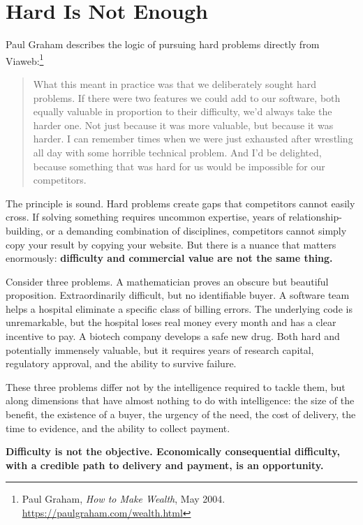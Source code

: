 \section{Hard Is Not Enough}
\label{sec:ch01-hard-is-not-enough}

Paul Graham describes the logic of pursuing hard problems directly from Viaweb:\footnote{Paul Graham, \emph{How to Make Wealth}, May 2004. \url{https://paulgraham.com/wealth.html}}

\begin{quote}
What this meant in practice was that we deliberately sought hard problems. If there were two features we could add to our software, both equally valuable in proportion to their difficulty, we'd always take the harder one. Not just because it was more valuable, but because it was harder. I can remember times when we were just exhausted after wrestling all day with some horrible technical problem. And I'd be delighted, because something that was hard for us would be impossible for our competitors.
\end{quote}

The principle is sound. Hard problems create gaps that competitors cannot easily cross. If solving something requires uncommon expertise, years of relationship-building, or a demanding combination of disciplines, competitors cannot simply copy your result by copying your website. But there is a nuance that matters enormously: \textbf{difficulty and commercial value are not the same thing.}

Consider three problems. A mathematician proves an obscure but beautiful proposition. Extraordinarily difficult, but no identifiable buyer. A software team helps a hospital eliminate a specific class of billing errors. The underlying code is unremarkable, but the hospital loses real money every month and has a clear incentive to pay. A biotech company develops a safe new drug. Both hard and potentially immensely valuable, but it requires years of research capital, regulatory approval, and the ability to survive failure.

These three problems differ not by the intelligence required to tackle them, but along dimensions that have almost nothing to do with intelligence: the size of the benefit, the existence of a buyer, the urgency of the need, the cost of delivery, the time to evidence, and the ability to collect payment.

\textbf{Difficulty is not the objective. Economically consequential difficulty, with a credible path to delivery and payment, is an opportunity.}

